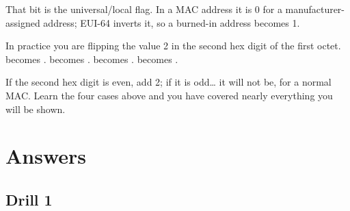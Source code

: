 \begin{worked}
That bit is the universal/local flag. In a MAC address it is 0 for a
manufacturer-assigned address; EUI-64 inverts it, so a burned-in address becomes
1.

In practice you are flipping the value 2 in the second hex digit of the first
octet.  becomes .  becomes .  becomes
.  becomes .

If the second hex digit is even, add 2; if it is odd\ldots{} it will not be, for
a normal MAC. Learn the four cases above and you have covered nearly everything
you will be shown.
\end{worked}

\section{Answers}\label{sec:c-answers}

\subsection{Drill 1}

